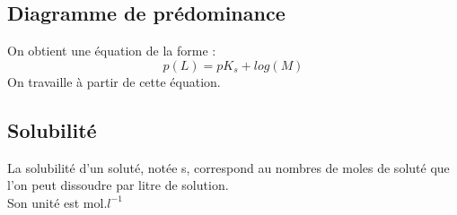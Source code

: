 \subsection{Diagramme de prédominance}
On obtient une équation de la forme : 
$$p(L) = pK_s + log(M)$$
On travaille à partir de cette équation.
\subsection{Solubilité}
\begin{de}
La solubilité d'un soluté, notée s, correspond au nombres de moles de soluté que l'on peut dissoudre par litre de solution.\\
Son unité est mol.$l^{-1}$
\end{de}
